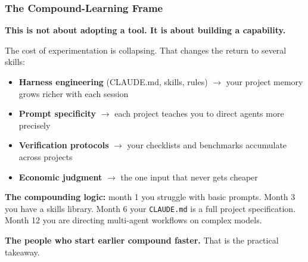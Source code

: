 \documentclass[10pt,english,aspectratio=169]{beamer}
\begin{document}
\begin{frame}
\frametitle{The Compound-Learning Frame}

\textbf{This is not about adopting a tool. It is about building a capability.}

\vspace{0.3cm}

The cost of experimentation is collapsing. That changes the return to several skills:

\vspace{0.2cm}

\begin{itemize}
    \item \textbf{Harness engineering} (CLAUDE.md, skills, rules) $\to$ your project memory grows richer with each session
    \vspace{0.1cm}
    \item \textbf{Prompt specificity} $\to$ each project teaches you to direct agents more precisely
    \vspace{0.1cm}
    \item \textbf{Verification protocols} $\to$ your checklists and benchmarks accumulate across projects
    \vspace{0.1cm}
    \item \textbf{Economic judgment} $\to$ the one input that never gets cheaper
\end{itemize}

\vspace{0.3cm}

\textbf{The compounding logic:} month 1 you struggle with basic prompts. Month 3 you have a skills library. Month 6 your \texttt{CLAUDE.md} is a full project specification. Month 12 you are directing multi-agent workflows on complex models.

\vspace{0.2cm}

\textbf{The people who start earlier compound faster.} That is the practical takeaway.
\end{frame}
\end{document}

